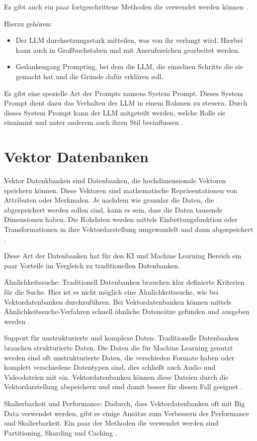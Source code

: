 Es gibt auch ein paar fortgeschrittene Methoden die verwendet werden können \cite{amatriainPromptDesignEngineering2024}. \par
Hierzu gehören: 
\begin{itemize}
    \item Der LLM durchsetzungsstark mitteilen, was von ihr verlangt wird. Hierbei kann auch in Großbuchstaben und mit Ausrufezeichen gearbeitet werden.\par
    \item Gedankengang Prompting, bei dem die LLM, die einzelnen Schritte die sie 
    gemacht hat und die Gründe dafür erklären soll.
\end{itemize}
Es gibt eine spezielle Art der Prompts namens System Prompt. Dieses System Prompt dient dazu 
das Verhalten der LLM in einem Rahmen zu steuern.
Durch dieses System Prompt kann der LLM mitgeteilt werden, welche Rolle sie einnimmt und 
unter anderem auch ihren Stil beeinflussen \cite{GivingClaudeRole}. \par

\section{Vektor Datenbanken}
\label{s:intro:dat}
Vektor Datenkbanken sind Datenbanken, die hochdimensionale Vektoren 
speichern können. Diese Vektoren sind mathematische Repräsentationen
von Attributen oder Merkmalen. Je nachdem wie granular die Daten, die 
abgespeichert werden sollen sind, kann es sein, dass die Daten tausende
Dimensionen haben. Die Rohdaten werden mittels Einbettungsfunktion oder 
Transformationen in ihre Vektordarstellung umgewandelt und dann abgespeichert \cite{hanComprehensiveSurveyVector2023}.\par
Diese Art der Datenbanken hat für den KI und Machine Learning Bereich ein 
paar Vorteile im Vergleich zu traditionellen Datenbanken. \par \bigskip
Ähnlichkeitssuche: Traditionell Datenbanken brauchen klar definierte 
Kriterien für die Suche. Hier ist es nicht möglich eine Ähnlichkeitssuche, 
wie bei Vektordatenbanken durchzuführen. Bei Vektordatenbanken können 
 mittels Ähnlichkeitssuche-Verfahren schnell ähnliche Datensätze
gefunden und ausgeben werden \cite{hanComprehensiveSurveyVector2023}. \par
Support für unstrukturierte und komplexe Daten: 
Traditionelle Datenbanken brauchen strukturierte Daten. Die Daten 
die für Machine Learning genutzt werden sind oft unstrukturierte Daten,
die verschieden Formate haben oder komplett verschiedene Datentypen sind,
dies schließt auch Audio und Videodateien mit ein. Vektordatenbanken
können diese Dateien durch die Vektordarstellung abspeichern und sind 
damit besser für diesen Fall geeignet \cite{hanComprehensiveSurveyVector2023}.\par
Skalierbarkeit und Performance: 
Dadurch, dass Vektordatenbanken oft mit Big Data verwendet werden,
gibt es einige Ansätze zum Verbessern der Performance und Skalierbarkeit.
Ein paar der Methoden die verwendet werden sind Partitioning, 
Sharding und Caching \cite{hanComprehensiveSurveyVector2023}.



